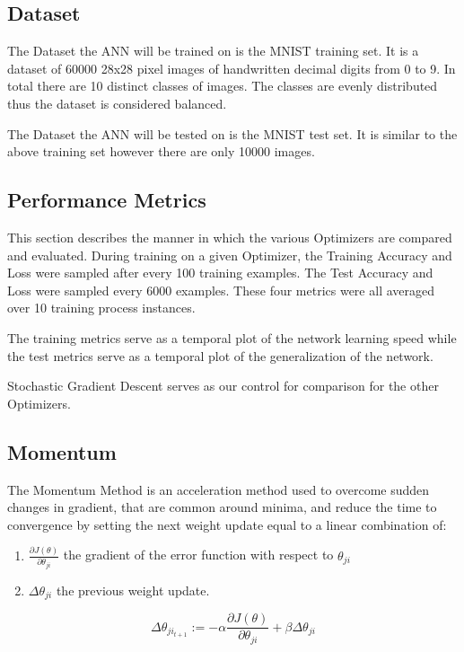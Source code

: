 \documentclass{article}
\begin{document}
  


\subsection{Dataset}

The Dataset the ANN will be trained on is the MNIST training set. It is a dataset of 60000 28x28 pixel images of handwritten decimal digits  from 0 to 9. In total there are 10 distinct classes of images. The classes are evenly distributed thus the dataset is considered balanced.

The Dataset the ANN will be tested on is the MNIST test set. It is similar to the above training set however there are only 10000 images.

\subsection{Performance Metrics}
This section describes the manner in which the various Optimizers are compared and evaluated.
\hfill\newline
During training on a given Optimizer, the Training Accuracy and Loss were sampled after every 100 training examples. The Test Accuracy and Loss were sampled every 6000 examples. These four metrics were all averaged over 10 training process instances. 

The training metrics serve as a temporal plot of the network learning speed while the test metrics serve as a temporal plot of the generalization of the network.

Stochastic Gradient Descent serves as our control for comparison for the other Optimizers.
\subsection{Momentum}
The Momentum Method is an acceleration method \cite{backpropagationOriginal} used to overcome sudden changes in gradient, that are common around minima, and reduce the time to convergence by setting the next weight update equal to a linear combination of:
\begin{enumerate}
	\item $\frac{\partial{J}(\theta)}{\partial{\theta_{ji}}}$ the gradient of the error function with respect to $\theta_{ji}$
	\item $\Delta\theta_{ji}$ the previous weight update.
\end{enumerate}  
\begin{equation}
\Delta\theta_{ji_{t+1}} := -\alpha\frac{\partial{J}(\theta)}{\partial{\theta_{ji}}} + \beta\Delta\theta_{ji}
\end{equation}
\end{document}
